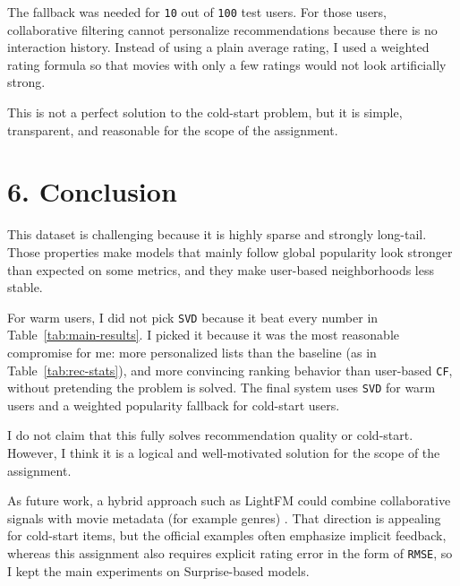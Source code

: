 \documentclass[10pt,a4paper]{article}
\begin{document}
The fallback was needed for \texttt{10} out of \texttt{100} test users. For those users, collaborative filtering cannot personalize recommendations because there is no interaction history. Instead of using a plain average rating, I used a weighted rating formula so that movies with only a few ratings would not look artificially strong.

This is not a perfect solution to the cold-start problem, but it is simple, transparent, and reasonable for the scope of the assignment.

\section*{6. Conclusion}
This dataset is challenging because it is highly sparse and strongly long-tail. Those properties make models that mainly follow global popularity look stronger than expected on some metrics, and they make user-based neighborhoods less stable.

For warm users, I did not pick \texttt{SVD} because it beat every number in Table~\ref{tab:main-results}. I picked it because it was the most reasonable compromise for me: more personalized lists than the baseline (as in Table~\ref{tab:rec-stats}), and more convincing ranking behavior than user-based \texttt{CF}, without pretending the problem is solved. The final system uses \texttt{SVD} for warm users and a weighted popularity fallback for cold-start users.

I do not claim that this fully solves recommendation quality or cold-start. However, I think it is a logical and well-motivated solution for the scope of the assignment.

As future work, a hybrid approach such as LightFM could combine collaborative signals with movie metadata (for example genres) \cite{lightfm}. That direction is appealing for cold-start items, but the official examples often emphasize implicit feedback, whereas this assignment also requires explicit rating error in the form of \texttt{RMSE}, so I kept the main experiments on Surprise-based models.
\end{document}

